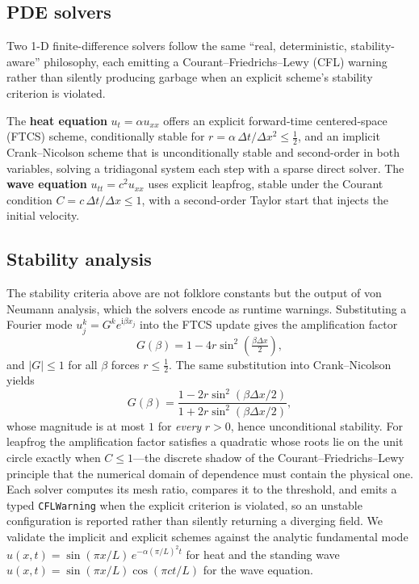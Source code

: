 \documentclass[sigplan,nonacm,screen]{acmart}
\begin{document}
\subsection{PDE solvers}
Two 1-D finite-difference solvers follow the same ``real, deterministic,
stability-aware'' philosophy, each emitting a Courant--Friedrichs--Lewy (CFL)
warning rather than silently
producing garbage when an explicit scheme's stability criterion is violated.

The \textbf{heat equation} $u_t = \alpha u_{xx}$ offers an explicit
forward-time centered-space (FTCS) scheme, conditionally stable for
$r = \alpha\,\Delta t/\Delta x^2 \le \tfrac12$, and an implicit
Crank--Nicolson scheme that is unconditionally stable and second-order in both
variables, solving a tridiagonal system each step with a sparse direct solver.
The \textbf{wave equation} $u_{tt} = c^2 u_{xx}$ uses explicit leapfrog, stable
under the Courant condition $C = c\,\Delta t/\Delta x \le 1$, with a
second-order Taylor start that injects the initial velocity.

\subsection{Stability analysis}
The stability criteria above are not folklore constants but the output of von
Neumann analysis, which the solvers encode as runtime warnings. Substituting a
Fourier mode $u_j^k = G^k e^{\mathrm{i}\beta x_j}$ into the FTCS update gives the
amplification factor
\[
  G(\beta) = 1 - 4r\sin^2\!\left(\tfrac{\beta \Delta x}{2}\right),
\]
and $|G| \le 1$ for all $\beta$ forces $r \le \tfrac12$. The same substitution into
Crank--Nicolson yields
\[
  G(\beta) = \frac{1 - 2r\sin^2(\beta\Delta x/2)}
                  {1 + 2r\sin^2(\beta\Delta x/2)},
\]
whose magnitude is at most $1$ for \emph{every} $r > 0$, hence unconditional
stability. For leapfrog the amplification factor satisfies a quadratic whose roots
lie on the unit circle exactly when $C \le 1$---the discrete shadow of the
Courant--Friedrichs--Lewy principle that the numerical domain of dependence must
contain the physical one. Each solver computes its mesh ratio, compares it to the
threshold, and emits a typed \texttt{CFLWarning} when the explicit criterion is
violated, so an unstable configuration is reported rather than silently returning
a diverging field. We validate the implicit and explicit schemes against the
analytic fundamental mode $u(x,t) = \sin(\pi x/L)\,e^{-\alpha(\pi/L)^2 t}$ for heat
and the standing wave $u(x,t) = \sin(\pi x/L)\cos(\pi c t/L)$ for the wave
equation.
\end{document}
